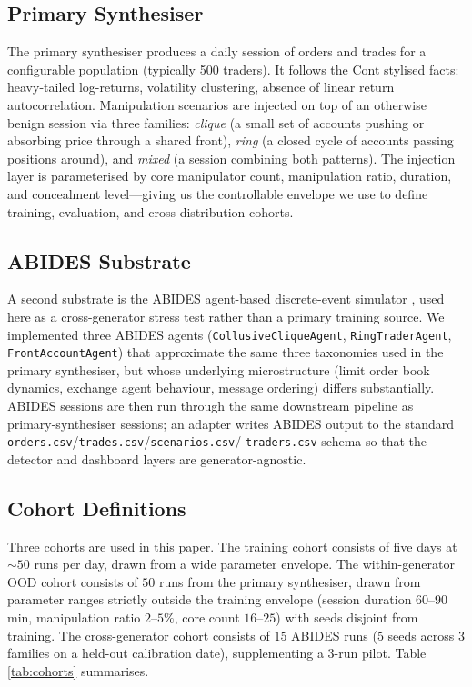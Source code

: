 \documentclass[10pt,twocolumn,letterpaper]{article}
\begin{document}
\subsection{Primary Synthesiser}
The primary synthesiser produces a daily session of orders and trades
for a configurable population (typically 500 traders). It follows the
Cont stylised facts: heavy-tailed log-returns, volatility clustering,
absence of linear return autocorrelation. Manipulation scenarios are
injected on top of an otherwise benign session via three families:
\emph{clique} (a small set of accounts pushing or absorbing price
through a shared front), \emph{ring} (a closed cycle of accounts
passing positions around), and \emph{mixed} (a session combining both
patterns). The injection layer is parameterised by core manipulator
count, manipulation ratio, duration, and concealment level---giving us
the controllable envelope we use to define training, evaluation, and
cross-distribution cohorts.

\subsection{ABIDES Substrate}
A second substrate is the ABIDES agent-based discrete-event simulator
\cite{byrd2019abides}, used here as a cross-generator stress test
rather than a primary training source. We implemented three ABIDES
agents (\texttt{CollusiveCliqueAgent}, \texttt{RingTraderAgent},
\texttt{FrontAccountAgent}) that approximate the same three taxonomies
used in the primary synthesiser, but whose underlying microstructure
(limit order book dynamics, exchange agent behaviour, message
ordering) differs substantially. ABIDES sessions are then run through
the same downstream pipeline as primary-synthesiser sessions; an
adapter writes ABIDES output to the standard
\texttt{orders.csv}/\texttt{trades.csv}/\texttt{scenarios.csv}/
\texttt{traders.csv} schema so that the detector and dashboard layers
are generator-agnostic.

\subsection{Cohort Definitions}
Three cohorts are used in this paper. The training cohort consists of
five days at \(\sim\!50\) runs per day, drawn from a wide parameter
envelope. The within-generator OOD cohort consists of \(50\) runs from
the primary synthesiser, drawn from parameter ranges strictly outside
the training envelope (session duration \(60\)--\(90\) min,
manipulation ratio \(2\)--\(5\%\), core count \(16\)--\(25\)) with
seeds disjoint from training. The cross-generator cohort consists of
\(15\) ABIDES runs (\(5\) seeds across \(3\) families on a held-out
calibration date), supplementing a \(3\)-run pilot. Table
\ref{tab:cohorts} summarises.
\end{document}
